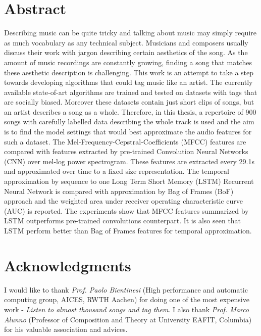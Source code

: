 \documentclass{book}
\begin{document}
\aicescoverpage


\section*{Abstract}

Describing music can be quite tricky and talking about music may simply require as much vocabulary as any technical subject. Musicians and composers usually discuss their work with jargon describing certain aesthetics of the song. As the amount of music recordings are constantly growing, finding a song that matches these aesthetic description is challenging. This work is an attempt to take a step towards developing algorithms that could tag music like an artist. The currently available state-of-art algorithms are trained and tested on datasets with tags that are socially biased. Moreover these datasets contain just short clips of songs, but an artist describes a song as a whole. Therefore, in this thesis, a repertoire of 900 songs with carefully labelled data describing the whole track is used and the aim is to find the model settings that would best approximate the audio features for such a dataset. The Mel-Frequency-Cepstral-Coefficients (MFCC) features are compared with features extracted by pre-trained Convolution Neural Networks (CNN) over mel-log power spectrogram. These features are extracted every 29.1s and approximated over time to a fixed size representation. The temporal approximation by sequence to one Long Term Short Memory (LSTM) Recurrent Neural Network is compared with approximation by Bag of Frames (BoF) approach and the weighted area under receiver operating characteristic curve (AUC) is reported. The experiments show that MFCC features summarized by LSTM outperforms pre-trained convolutions counterpart. It is also seen that LSTM perform better than Bag of Frames features for temporal approximation.     

\vspace{5cm}


\newpage

\section*{\bf Acknowledgments}
I would like to thank \textit{Prof. Paolo Bientinesi} (High performance and automatic computing group, AICES, RWTH Aachen) for doing one of the most expensive work - \textit{Listen to almost thousand songs and tag them}. I also thank  \textit{Prof. Marco Alunno} (Professor of Composition and Theory at University EAFIT, Columbia) for his valuable association and advices.  
\tableofcontents
\end{document}
